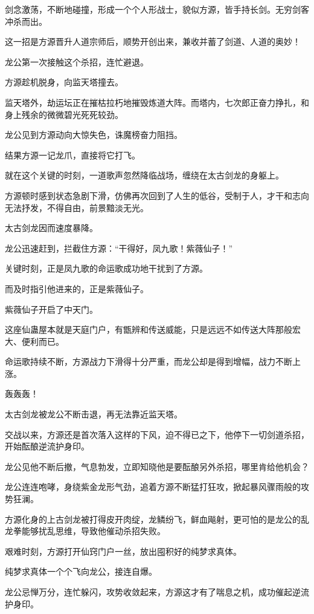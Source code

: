 \begin{this_body}
剑念激荡，不断地碰撞，形成一个个人形战士，貌似方源，皆手持长剑。无穷剑客冲杀而出。

这一招是方源晋升人道宗师后，顺势开创出来，兼收并蓄了剑道、人道的奥妙！

龙公第一次接触这个杀招，连忙避退。

方源趁机脱身，向监天塔撞去。

监天塔外，劫运坛正在摧枯拉朽地摧毁炼道大阵。而塔内，七次郎正奋力挣扎，和身上残余的微微碧光死死较劲。

龙公见到方源动向大惊失色，诛魔榜奋力阻挡。

结果方源一记龙爪，直接将它打飞。

就在这个关键的时刻，一道歌声忽然降临战场，缠绕在太古剑龙的身躯上。

方源顿时感到状态急剧下滑，仿佛再次回到了人生的低谷，受制于人，才干和志向无法抒发，不得自由，前景黯淡无光。

太古剑龙因而速度暴降。

龙公迅速赶到，拦截住方源：“干得好，凤九歌！紫薇仙子！”

关键时刻，正是凤九歌的命运歌成功地干扰到了方源。

而及时指引他进来的，正是紫薇仙子。

紫薇仙子开启了中天门。

这座仙蛊屋本就是天庭门户，有甑辨和传送威能，只是远远不如传送大阵那般宏大、便利而已。

命运歌持续不断，方源战力下滑得十分严重，而龙公却是得到增幅，战力不断上涨。

轰轰轰！

太古剑龙被龙公不断击退，再无法靠近监天塔。

交战以来，方源还是首次落入这样的下风，迫不得已之下，他停下一切剑道杀招，开始酝酿逆流护身印。

龙公见他不断后撤，气息勃发，立即知晓他是要酝酿另外杀招，哪里肯给他机会？

龙公连连咆哮，身绕紫金龙形气劲，追着方源不断猛打狂攻，掀起暴风骤雨般的攻势狂澜。

方源化身的上古剑龙被打得皮开肉绽，龙鳞纷飞，鲜血飚射，更可怕的是龙公的乱龙拳能够扰乱思维，导致他催动杀招失败。

艰难时刻，方源打开仙窍门户一丝，放出囤积好的纯梦求真体。

纯梦求真体一个个飞向龙公，接连自爆。

龙公忌惮万分，连忙躲闪，攻势收敛起来，方源这才有了喘息之机，成功催起逆流护身印。


\end{this_body}
